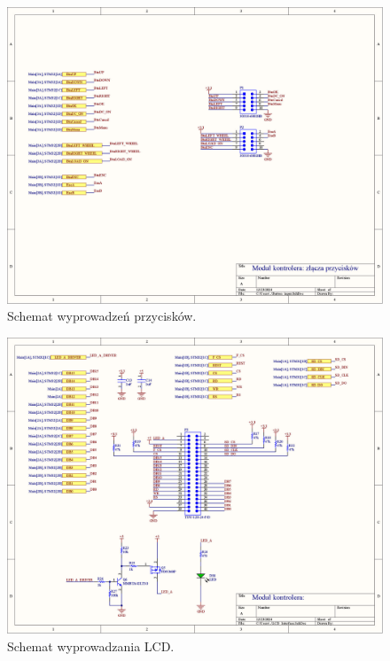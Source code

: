 \begin{figure}
    \begin{center}
        \includegraphics[width = 21cm]{zalaczniki/kontroler/Kontroler_Strona_06.jpg}
        \caption{Schemat wyprowadzeń przycisków.}
    \end{center}
\end{figure}

\begin{figure}
    \begin{center}
        \includegraphics[width = 21cm]{zalaczniki/kontroler/Kontroler_Strona_07.jpg}
        \caption{Schemat wyprowadzania LCD.}
    \end{center}
\end{figure}

